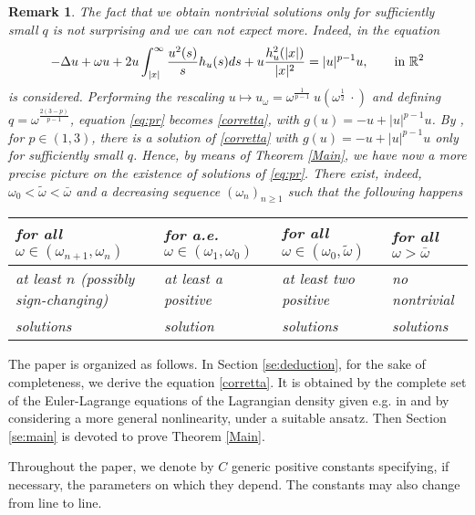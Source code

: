 \documentclass[11pt,leqno,twoside,reqno]{amsart}
\numberwithin{equation}{section}
\newtheorem{remark}[theorem]{Remark}
\begin{document}
\begin{remark}
The fact that we obtain  nontrivial solutions only for sufficiently small $q$ is not surprising and we can not 
expect more. Indeed, in \cite{PR1} the  equation 
\begin{equation}\label{eq:pr}
-\Delta u+ \omega u+ 2u \int_{|x|}^{\infty}\frac{u^{2}(s)}{s}h_u(s)ds  + u\frac{h^{2}_u(|x|)}{|x|^{2}} = |u|^{p-1}u, \qquad \hbox{in }{{\mathbb{R}^2}}
\end{equation}
is considered.
Performing the rescaling $u\mapsto u_{\omega}={\omega}^\frac{1}{p-1}\ u({\omega}^\frac 12 \ \cdot)$ and defining $q={\omega}^\frac{2(3-p)}{p-1}$, equation \eqref{eq:pr} 
becomes  \eqref{corretta}, with $g(u)=-u+|u|^{p-1}u$.
By \cite[Theorem 1.2]{PR1}, for $p\in (1,3)$,  there is a solution of \eqref{corretta} with $g(u)=-u+|u|^{p-1}u$ only for sufficiently small $q$.
Hence, by means of Theorem \ref{Main}, we have now a more precise picture on the existence of solutions of \eqref{eq:pr}. There exist, indeed, 
${\omega}_0<\tilde{\omega}<\bar {\omega}$  and a decreasing sequence $({\omega}_n)_{n{\geqslant} 1}$ such that the following happens
\vspace{.1cm}
\begin{center}
\begin{tabular}{|l|l|l|l|}
\hline
for all ${\omega}\in ({\omega}_{n+1},{\omega}_n) $
&
for a.e. ${\omega}\in ({\omega}_1,{\omega}_0)$
&
for all ${\omega}\in ({\omega}_0,\tilde{\omega})$
&
for all ${\omega}>\bar{\omega}$   
\\
\hline
at least $n$ (possibly sign-changing)
&
at least a positive
&
at least two positive
&
no nontrivial  
\\
solutions &  solution &  solutions &  solutions \\
\hline
\end{tabular}
\end{center}
\end{remark}

The paper is organized as follows. In Section \ref{se:deduction}, for the sake of completeness, we derive the equation \eqref{corretta}. 
It is obtained by the complete set of the Euler-Lagrange equations  of the Lagrangian density given e.g. in  \cite[eqn. (8)]{JP1} and by 
considering a more general nonlinearity, under a suitable ansatz. Then Section \ref{se:main} is devoted to prove Theorem \ref{Main}.

Throughout the paper, we denote by $C$  generic positive constants  specifying, if necessary, the parameters on 
which they depend. The constants may also change from line to line.
\end{document}
